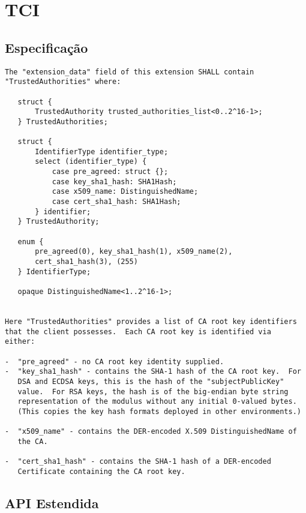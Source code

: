 
\section{\acl{TCI}}

\subsection{Especificação}

\begin{lstlisting}[caption={RFC 3546, trecho da seção 3.4}]
The "extension_data" field of this extension SHALL contain 
"TrustedAuthorities" where: 
 
   struct { 
       TrustedAuthority trusted_authorities_list<0..2^16-1>; 
   } TrustedAuthorities; 
 
   struct { 
       IdentifierType identifier_type; 
       select (identifier_type) { 
           case pre_agreed: struct {}; 
           case key_sha1_hash: SHA1Hash; 
           case x509_name: DistinguishedName; 
           case cert_sha1_hash: SHA1Hash; 
       } identifier; 
   } TrustedAuthority; 
 
   enum { 
       pre_agreed(0), key_sha1_hash(1), x509_name(2), 
       cert_sha1_hash(3), (255) 
   } IdentifierType; 
 
   opaque DistinguishedName<1..2^16-1>; 
 
 
Here "TrustedAuthorities" provides a list of CA root key identifiers 
that the client possesses.  Each CA root key is identified via 
either: 
 
-  "pre_agreed" - no CA root key identity supplied. 
-  "key_sha1_hash" - contains the SHA-1 hash of the CA root key.  For 
   DSA and ECDSA keys, this is the hash of the "subjectPublicKey" 
   value.  For RSA keys, the hash is of the big-endian byte string 
   representation of the modulus without any initial 0-valued bytes. 
   (This copies the key hash formats deployed in other environments.) 
 
-  "x509_name" - contains the DER-encoded X.509 DistinguishedName of 
   the CA. 
 
-  "cert_sha1_hash" - contains the SHA-1 hash of a DER-encoded 
   Certificate containing the CA root key.
\end{lstlisting}

\subsection{API Estendida}

